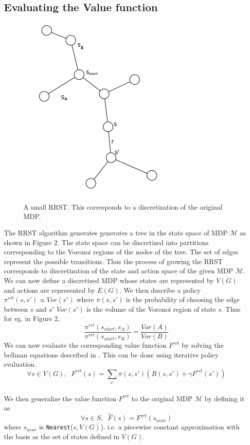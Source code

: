 \documentclass[wcp]{jmlr}
\begin{document}
\subsection*{Evaluating the Value function}
\begin{figure}[htb]
\centering
\label{fig:rrst}
\includegraphics[scale=0.4]{rrst.png}
\caption{A small RRST. This corresponds to a discretization of the original MDP.}
\end{figure}

The RRST algorithm generates generates a tree in the state space of MDP $\mathcal{M}$ as shown in Figure 2. The state space can be discretized into partitions corresponding to the Voronoi regions of the nodes of the tree. The set of edges represent the possible transitions. Thus the process of growing the RRST corresponds to discretization of the state and action space of the given MDP $\mathcal{M}$. We can now define a discretized MDP whose states are represented by $V(G)$ and actions are represented by $E(G)$. We then describe a policy $\pi^{rrt}(s,s') \varpropto Vor(s')$ where $\pi(s,s')$ is the probability of choosing the edge between $s$ and $s'$ $Vor(s')$ is the volume of the Voronoi region of state $s$. Thus for eg. in Figure 2,
\begin{equation*}
\frac{\pi^{rrt}(s_{start},s_A)}{\pi^{rrt}(s_{start},s_B)} = \frac{Vor(A)}{Vor(B)}
\end{equation*}
We can now evaluate the corresponding value function $F^{rrt}$ by solving the bellman equations described in .
This can be done using iterative policy evaluation.
\begin{equation}
\label{eq:poleval}
\forall s \in V(G),\;\; F^{rrt}(s) = \sum_{s'}\pi(s,s')( R(s,s') + \gamma F^{rrt}(s'))
\end{equation}\\
We then generalize the value function $F^{rrt}$ to the original MDP $\mathcal{M}$ by defining it as 
\begin{equation*}
\forall s \in S,\;\; \hat{F}(s) = F^{rrt}(s_{near})
\end{equation*}
where $s_{near}$ is \texttt{Nearest}($s,V(G)$). i.e. a piecewise constant approximation with the basis as the set of states defined in $V(G)$.
\end{document}
